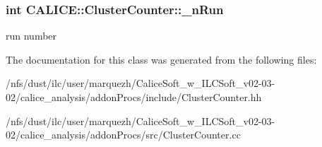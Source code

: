 \subsubsection[{\-\_\-n\-Run}]{\setlength{\rightskip}{0pt plus 5cm}int C\-A\-L\-I\-C\-E\-::\-Cluster\-Counter\-::\-\_\-n\-Run\hspace{0.3cm}{\ttfamily [protected]}}\label{classCALICE_1_1ClusterCounter_aa839b23c89bea85c92b3cf3bbf4dd89d}
run number 

The documentation for this class was generated from the following files\-:\begin{DoxyCompactItemize}
\item 
/nfs/dust/ilc/user/marquezh/\-Calice\-Soft\-\_\-w\-\_\-\-I\-L\-C\-Soft\-\_\-v02-\/03-\/02/calice\-\_\-analysis/addon\-Procs/include/Cluster\-Counter.\-hh\item 
/nfs/dust/ilc/user/marquezh/\-Calice\-Soft\-\_\-w\-\_\-\-I\-L\-C\-Soft\-\_\-v02-\/03-\/02/calice\-\_\-analysis/addon\-Procs/src/Cluster\-Counter.\-cc\end{DoxyCompactItemize}
